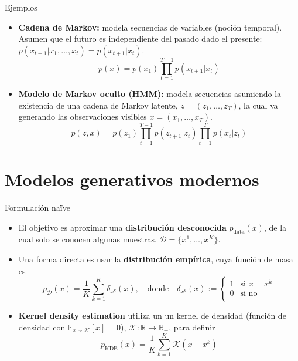 \documentclass{beamer}
\newcommand{\R}{\mathbb{R}}
\begin{document}
\begin{frame}{Ejemplos}
    \begin{itemize}
        \item \textbf{Cadena de Markov:} modela secuencias de variables (noción temporal). Asumen que el futuro es independiente del pasado dado el presente: $p(x_{t+1}|x_1,\ldots,x_t)=p(x_{t+1}|x_t)$.
              \begin{equation*}
                  p(x)=p(x_1)\prod_{t=1}^{T-1} p(x_{t+1}|x_t)
              \end{equation*}
        \item \textbf{Modelo de Markov oculto (HMM):} modela secuencias asumiendo la existencia de una cadena de Markov latente, $z=(z_1,\ldots,z_T)$, la cual va generando las observaciones visibles $x=(x_1,\ldots,x_T)$.
              \begin{equation*}
                  p(z,x)=p(z_1)\prod_{t=1}^{T-1} p(z_{t+1}|z_t)\prod_{t=1}^T p(x_t|z_t)
              \end{equation*}
    \end{itemize}
\end{frame}

\section{Modelos generativos modernos}

\begin{frame}{Formulación naïve}
    \begin{itemize}
        \item El objetivo es aproximar una \textbf{distribución desconocida} $p_{\text{data}}(x)$, de la cual solo se conocen algunas muestras, $\mathcal{D}=\{x^1,\ldots,x^K\}$.
        \item Una forma directa es usar la \textbf{distribución empírica}, cuya función de masa es
              \begin{equation*}
                  p_{\mathcal{D}}(x)=\frac{1}{K}\sum_{k=1}^K \delta_{x^k}(x),
                  \quad\text{donde}\quad
                  \delta_{x^k}(x):=
                  \begin{cases}
                      1 & \text{si }x=x^k \\
                      0 & \text{si no}    \\
                  \end{cases}
              \end{equation*}
        \item \textbf{Kernel density estimation} utiliza un un kernel de densidad (función de densidad con $\mathbb{E}_{x\sim \mathcal{K}}\left[x\right]=0$), $\mathcal{K}:\R\to\R_+$, para definir
              \begin{equation*}
                  p_{\text{KDE}}(x)=\frac{1}{K}\sum_{k=1}^K \mathcal{K}(x-x^k)
              \end{equation*}
    \end{itemize}
\end{frame}
\end{document}
